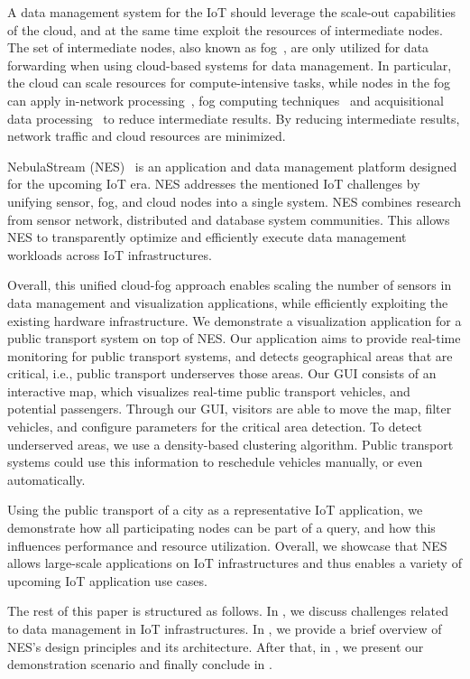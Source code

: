 A data management system for the IoT should leverage the scale-out capabilities of the cloud, and at the same time exploit the resources of intermediate nodes. The set of intermediate nodes, also known as fog~\cite{fog}, are only utilized for data forwarding when using cloud-based systems for data management. In particular, the cloud can scale resources for compute-intensive tasks, while nodes in the fog can apply in-network processing~\cite{in-network}, fog computing techniques~\cite{frontier} and acquisitional data processing~\cite{tinydb} to reduce intermediate results. By reducing intermediate results, network traffic and cloud resources are minimized.

NebulaStream (NES)~\cite{nes} is an application and data management platform designed for the upcoming IoT era. 
NES addresses the mentioned IoT challenges by unifying sensor, fog, and cloud nodes into a single system.
NES combines research from sensor network, distributed and database system communities. 
This allows NES to transparently optimize and efficiently execute data management workloads across IoT infrastructures.

Overall, this unified cloud-fog approach enables scaling the number of sensors in data management and visualization applications, while efficiently exploiting the existing hardware infrastructure.
We demonstrate a visualization application for a public transport system on top of NES. 
Our application aims to provide real-time monitoring for public transport systems, and detects geographical areas that are critical, i.e., public transport underserves those areas.
Our GUI consists of an interactive map, which visualizes real-time public transport vehicles, and potential passengers. 
Through our GUI, visitors are able to move the map, filter vehicles, and configure parameters for the critical area detection. To detect underserved areas, we use a density-based clustering algorithm.
Public transport systems could use this information to reschedule vehicles manually, or even automatically.

Using the public transport of a city as a representative IoT application, we demonstrate how all participating nodes can be part of a query, and how this influences performance and resource utilization. 
Overall, we showcase that NES allows large-scale applications on IoT infrastructures and thus enables a variety of upcoming IoT application use cases.

The rest of this paper is structured as follows. In , we discuss challenges related to data management in IoT infrastructures. In , we provide a brief overview of NES's design principles and its architecture. After that, in , we present our demonstration scenario and finally  conclude in .

